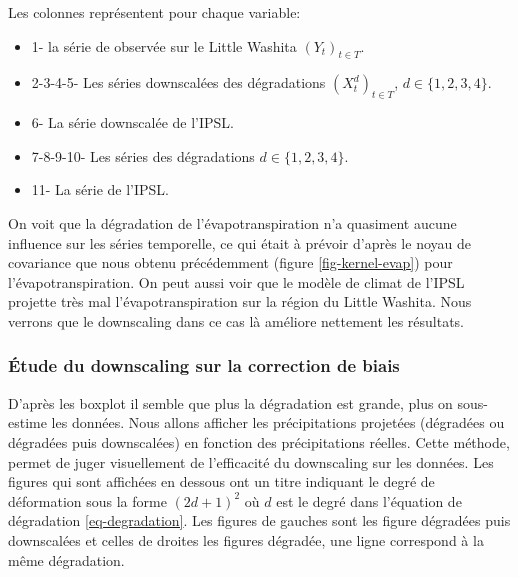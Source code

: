\documentclass[a4paper,11pt]{article}
\numberwithin{equation}{section}
\begin{document}
Les colonnes représentent pour chaque variable:
\begin{itemize}
	\item 1- la série de observée sur le Little Washita $(Y_t)_{t\in T}$. 
	\item 2-3-4-5- Les séries downscalées des dégradations $(X^d_t)_{t \in T}$, $d \in \{1,2,3,4\}$.
	\item 6- La série downscalée de l'IPSL. 
	\item 7-8-9-10- Les séries des dégradations $d \in \{1,2,3,4\}$.
	\item 11- La série de l'IPSL. 
\end{itemize}
On voit que la dégradation de l'évapotranspiration n'a quasiment aucune influence sur les séries temporelle, ce qui était à prévoir d'après le noyau de covariance que nous obtenu précédemment (figure \ref{fig-kernel-evap}) pour l'évapotranspiration. On peut aussi voir que le modèle de climat de l'IPSL projette très mal l'évapotranspiration sur la région du Little Washita. Nous verrons que le downscaling dans ce cas là améliore nettement les résultats.

\subsubsection{Étude du downscaling sur la correction de biais}

D'après les boxplot il semble que plus la dégradation est grande, plus on sous-estime les données. Nous allons afficher les précipitations projetées (dégradées ou dégradées puis downscalées) en fonction des précipitations réelles. Cette méthode, permet de juger visuellement de l'efficacité du downscaling sur les données. Les figures qui sont affichées en dessous ont un titre indiquant le degré de déformation sous la forme $(2d+1)^2$ où $d$ est le degré dans l'équation de dégradation \eqref{eq-degradation}. Les figures de gauches sont les figure dégradées puis downscalées et celles de droites les figures dégradée, une ligne correspond à la même dégradation.	

\vspace{0.7cm}
\end{document}
